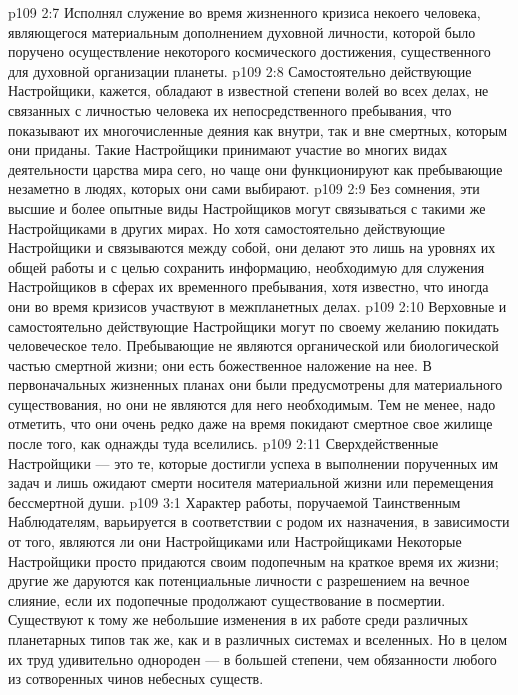 \vs p109 2:7 \pc {}\bibnobreakspace Исполнял служение во время жизненного кризиса некоего человека, являющегося материальным дополнением духовной личности, которой было поручено осуществление некоторого космического достижения, существенного для духовной организации планеты.
\vs p109 2:8 \pc Самостоятельно действующие Настройщики, кажется, обладают в известной степени волей во всех делах, не связанных с личностью человека их непосредственного пребывания, что показывают их многочисленные деяния как внутри, так и вне смертных, которым они приданы. Такие Настройщики принимают участие во многих видах деятельности царства мира сего, но чаще они функционируют как пребывающие незаметно в людях, которых они сами выбирают.
\vs p109 2:9 Без сомнения, эти высшие и более опытные виды Настройщиков могут связываться с такими же Настройщиками в других мирах. Но хотя самостоятельно действующие Настройщики и связываются между собой, они делают это лишь на уровнях их общей работы и с целью сохранить информацию, необходимую для служения Настройщиков в сферах их временного пребывания, хотя известно, что иногда они во время кризисов участвуют в межпланетных делах.
\vs p109 2:10 Верховные и самостоятельно действующие Настройщики могут по своему желанию покидать человеческое тело. Пребывающие не являются органической или биологической частью смертной жизни; они есть божественное наложение на нее. В первоначальных жизненных планах они были предусмотрены для материального существования, но они не являются для него необходимым. Тем не менее, надо отметить, что они очень редко даже на время покидают смертное свое жилище после того, как однажды туда вселились.
\vs p109 2:11 Сверхдейственные Настройщики --- это те, которые достигли успеха в выполнении порученных им задач и лишь ожидают смерти носителя материальной жизни или перемещения бессмертной души.
\vs p109 3:1 Характер работы, поручаемой Таинственным Наблюдателям, варьируется в соответствии с родом их назначения, в зависимости от того, являются ли они Настройщиками  или Настройщиками  Некоторые Настройщики просто придаются своим подопечным на краткое время их жизни; другие же даруются как потенциальные личности с разрешением на вечное слияние, если их подопечные продолжают существование в посмертии. Существуют к тому же небольшие изменения в их работе среди различных планетарных типов так же, как и в различных системах и вселенных. Но в целом их труд удивительно однороден --- в большей степени, чем обязанности любого из сотворенных чинов небесных существ.
